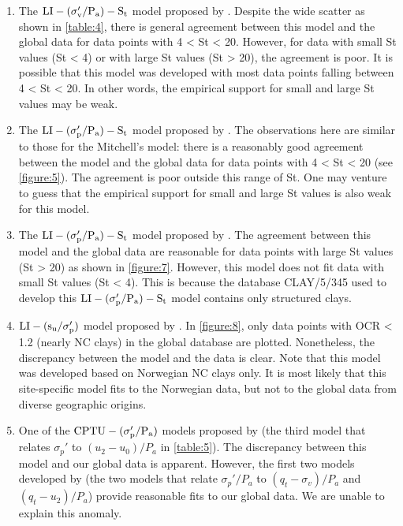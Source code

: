 \begin{paracol}{2}
{\begin{enumerate}
        \item The $\rm{LI}-(\sigma_v'/P_a)-S_t$ model proposed by \citet{Mitchell1993}. Despite the wide scatter as shown in \autoref{table:4}, there is general agreement between this model and the global data for data points with 4 < St < 20. However, for data with small St values (St < 4) or with large St values (St > 20), the agreement is poor. It is possible that this model was developed with most data points falling between 4 < St < 20. In other words, the empirical support for small and large St values may be weak.
        
        \item The $\rm{LI}-(\sigma_p'/P_a)-S_t$ model proposed by \citet{NAVFAC1982}. The observations here are similar to those for the Mitchell’s model: there is a reasonably good agreement between the model and the global data for data points with 4 < St < 20 (see \autoref{figure:5}). The agreement is poor outside this range of St. One may venture to guess that the empirical support for small and large St values is also weak for this model.
        
        \item The $\rm{LI}-(\sigma_p'/P_a)-S_t$ model proposed by \citet{Ching2012522}. The agreement between this model and the global data are reasonable for data points with large St values (St > 20) as shown in \autoref{figure:7}. However, this model does not fit data with small St values (St < 4). This is because the database CLAY/5/345 used to develop this $\rm{LI}-(\sigma_p'/P_a)-S_t$ model contains only structured clays.
        
        \item $\rm{LI}-(s_u/\sigma_p')$ model proposed by \citet{Bjerrum1960711}. In \autoref{figure:8}, only data points with OCR < 1.2 (nearly NC clays) in the global database are plotted. Nonetheless, the discrepancy between the model and the data is clear. Note that this model was developed based on Norwegian NC clays only. It is most likely that this site-specific model fits to the Norwegian data, but not to the global data from diverse geographic origins.
        
        \item One of the $\rm{CPTU}-(\sigma_p'/P_a)$ models proposed by \citet{Chen1996488} (the third model that relates $\sigma_p'$ to $(u_2-u_0)/P_a$ in \autoref{table:5}). The discrepancy between this model and our global data is apparent. However, the first two models developed by \citet{Chen1996488} (the two models that relate $\sigma_p'/P_a$ to $(q_t-\sigma_v)/P_a$ and $(q_t-u_2)/P_a$) provide reasonable fits to our global data. We are unable to explain this anomaly.
    \end{enumerate}

}
\end{paracol}
